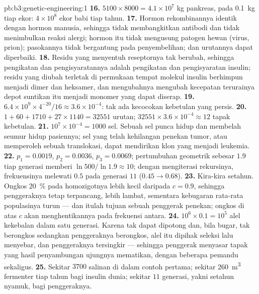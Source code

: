\begin{solution}{pb:b3:genetic-engineering:1}
\textbf{16.} $5100\times 8000 = 4.1\times 10^{7}$ kg pankreas, pada
\qty{0.1}{kg} tiap ekor: $4\times 10^{8}$ ekor babi tiap tahun.
\textbf{17.} Hormon rekombinannya identik dengan hormon manusia, sehingga
tidak membangkitkan antibodi dan tidak menimbulkan reaksi alergi; hormon itu
tidak mengusung patogen hewan (virus, prion); pasokannya tidak bergantung pada
penyembelihan; dan urutannya dapat diperbaiki.
\textbf{18.} Residu yang menyentuh reseptornya tak berubah, sehingga
pengikatan dan pengisyaratannya adalah pengikatan dan pengisyaratan insulin;
residu yang diubah terletak di permukaan tempat molekul insulin berhimpun
menjadi dimer dan heksamer, dan mengubahnya mengubah kecepatan terurainya
depot suntikan itu menjadi monomer yang dapat diserap.
\textbf{19.} $6.4\times 10^{9}\times 4^{-20}/16 \approx 3.6\times
10^{-4}$: tak ada kecocokan kebetulan yang persis.
\textbf{20.} $1 + 60 + 1710 + 27\times 1140 = \num{32551}$ urutan;
$\num{32551}\times 3.6\times 10^{-4} \approx 12$ tapak 
kebetulan.
\textbf{21.} $10^{7}\times 10^{-4} = 1000$ sel. Sebuah sel punca hidup dan
membelah seumur hidup pasiennya; sel yang telah kehilangan penekan
tumor, atau memperoleh sebuah translokasi, dapat mendirikan klon yang menjadi
leukemia.
\textbf{22.} $p_{1} = 0.0019$, $p_{2} = 0.0036$, $p_{3} = 0.0069$;
pertumbuhan geometrik sebesar $1.9$ tiap generasi memberi $\ln 500/\ln 1.9
\approx 10$; dengan mengiterasi rekursinya, frekuensinya melewati $0.5$ pada
generasi $11$ ($0.45 \to 0.68$).
\textbf{23.} Kira-kira setahun. Ongkos \qty{20}{\%} pada homozigotnya lebih
kecil daripada $c = 0.9$, sehingga penggeraknya tetap terpancang, lebih
lambat, sementara kebugaran rata-rata populasinya turun --- dan itulah tujuan
sebuah penggerak penekan; ongkos di atas $c$ akan menghentikannya pada
frekuensi antara.
\textbf{24.} $10^{6}\times 0.1 = 10^{5}$ alel kekebalan dalam satu
generasi. Karena tak dapat dipotong dan, bila bugar, tak berongkos sedangkan
penggeraknya berongkos, alel itu dipihak seleksi lalu menyebar, dan
penggeraknya tersingkir --- sehingga penggerak menyasar tapak yang hasil
penyambungan ujungnya mematikan, dengan beberapa pemandu sekaligus.
\textbf{25.} Sekitar $3700$ salinan di dalam contoh pertama; sekitar \qty{260}{m^3}
fermenter tiap tahun bagi insulin dunia; sekitar $11$ generasi, yakni setahun
nyamuk, bagi penggeraknya.
\end{solution}

